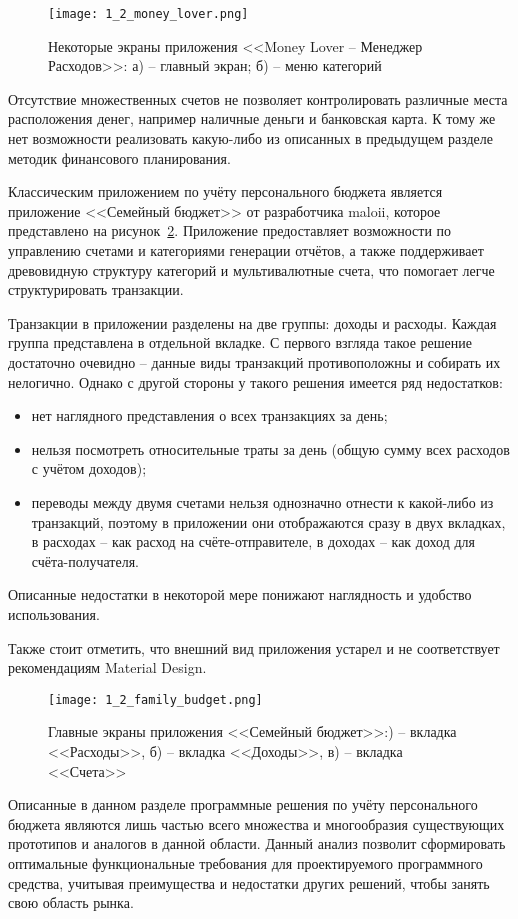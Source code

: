 \begin{figure}[h]
    \centering
    \texttt{[image: 1\_2\_money\_lover.png]}
    \caption{Некоторые экраны приложения <<Money Lover -- Менеджер Расходов>>: а) -- главный экран; б) -- меню категорий}
    \label{fig:analysis:analogues:money_lover}
\end{figure}

Отсутствие множественных счетов не позволяет контролировать различные места расположения денег, например наличные деньги и банковская карта.
К тому же нет возможности реализовать какую-либо из описанных в предыдущем разделе методик финансового планирования.

Классическим приложением по учёту персонального бюджета является приложение <<Семейный бюджет>> от разработчика maloii, которое представлено на рисунок~\ref{fig:analysis:analogues:family_budget}.
Приложение предоставляет возможности по управлению счетами и категориями генерации отчётов, а также поддерживает древовидную структуру категорий и мультивалютные счета, что помогает легче структурировать транзакции.

Транзакции в приложении разделены на две группы: доходы и расходы.
Каждая группа представлена в отдельной вкладке.
С первого взгляда такое решение достаточно очевидно -- данные виды транзакций противоположны и собирать их нелогично.
Однако с другой стороны у такого решения имеется ряд недостатков:
\begin{itemize}
    \item нет наглядного представления о всех транзакциях за день;
    \item нельзя посмотреть относительные траты за день (общую сумму всех расходов с учётом доходов);
    \item переводы между двумя счетами нельзя однозначно отнести к какой-либо из транзакций, поэтому в приложении они отображаются сразу в двух вкладках, в расходах -- как расход на счёте-отправителе, в доходах -- как доход для счёта-получателя.
\end{itemize}

Описанные недостатки в некоторой мере понижают наглядность и удобство использования.

Также стоит отметить, что внешний вид приложения устарел и не соответствует рекомендациям Material Design.

\begin{figure}[h]
    \centering
    \texttt{[image: 1\_2\_family\_budget.png]}
    \caption{Главные экраны приложения <<Семейный бюджет>>:) -- вкладка <<Расходы>>, б) -- вкладка <<Доходы>>, в) -- вкладка <<Счета>>}
    \label{fig:analysis:analogues:family_budget}
\end{figure}


Описанные в данном разделе программные решения по учёту персонального бюджета являются лишь частью всего множества и многообразия существующих прототипов и аналогов в данной области.
Данный анализ позволит сформировать оптимальные функциональные требования для проектируемого программного средства, учитывая преимущества и недостатки других решений, чтобы занять свою область рынка.